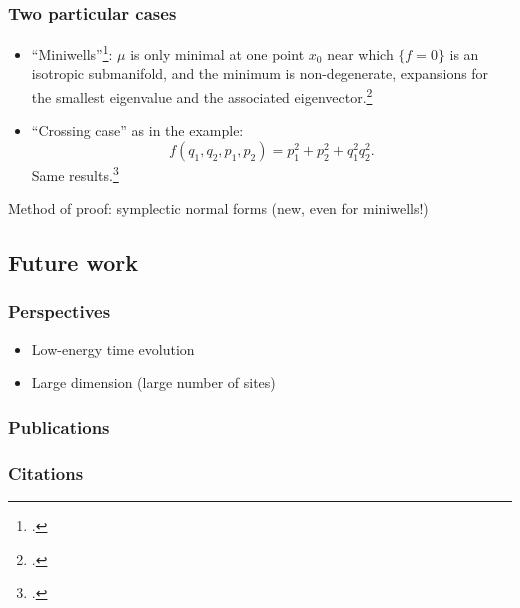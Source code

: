 \documentclass[mathserif]{beamer}
\begin{document}
\begin{frame}
  \frametitle{Two particular cases}
  \begin{itemize}
  \item ``Miniwells''\footcite{helffer_puits_1986}: $\mu$ is only minimal at one point $x_0$ near which $\{f=0\}$ is
    an isotropic submanifold, and the minimum is non-degenerate,
    expansions for the smallest eigenvalue and the associated
    eigenvector.\footcite{deleporte_low-energy_2017}
  \item ``Crossing case'' as in the example:
    \[
      f(q_1,q_2,p_1,p_2)=p_1^2+p_2^2+q_1^2q_2^2.
      \]
    Same results.\footcite{deleporte_low-energy_2017}
  \end{itemize}
  Method of proof: symplectic normal forms (new, even for miniwells!)
\end{frame}

\subsection{Future work}
\begin{frame}
  \frametitle{Perspectives}
    \begin{itemize}
    \item Low-energy time evolution
    \item Large dimension (large number of sites)
    \end{itemize}
  \end{frame}

  \begin{frame}
    \frametitle{Publications}
    \printbibliography[keyword=Deleporte,heading=none]
  \end{frame}

  \begin{frame}[allowframebreaks]
    \frametitle{Citations}
    \printbibliography[notkeyword=Deleporte,heading=none]
  \end{frame}
\end{document}
